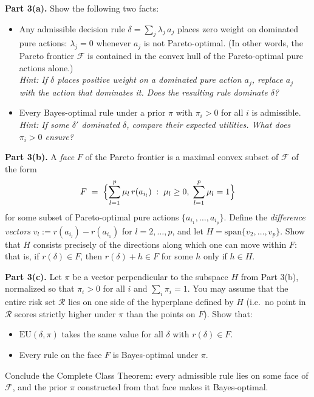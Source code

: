 \documentclass[8pt]{article}
\begin{document}
\medskip
\noindent
\textbf{Part 3(a).} Show the following two facts:
\begin{itemize}
  \item[(i)] Any admissible decision rule $\delta = \sum_j \lambda_j\, a_j$ places
    zero weight on dominated pure actions: $\lambda_j = 0$ whenever $a_j$ is not
    Pareto-optimal. (In other words, the Pareto frontier $\mathcal{F}$ is contained
    in the convex hull of the Pareto-optimal pure actions alone.)\\
    \emph{Hint: If $\delta$ places positive weight on a dominated pure action $a_j$,
    replace $a_j$ with the action that dominates it. Does the resulting rule dominate
    $\delta$?}
  \item[(ii)] Every Bayes-optimal rule under a prior $\pi$ with $\pi_i > 0$ for all
    $i$ is admissible.\\
    \emph{Hint: If some $\delta'$ dominated $\delta$, compare their expected
    utilities. What does $\pi_i > 0$ ensure?}
\end{itemize}

\medskip
\noindent
\textbf{Part 3(b).} A \emph{face} $F$ of the Pareto frontier is a maximal convex
subset of $\mathcal{F}$ of the form
\[
  F \;=\; \Bigl\{\sum_{l=1}^p \mu_l\, r(a_{i_l}) \;:\;
  \mu_l \geq 0,\; \sum_{l=1}^p \mu_l = 1\Bigr\}
\]
for some subset of Pareto-optimal pure actions $\{a_{i_1}, \ldots, a_{i_p}\}$. Define
the \emph{difference vectors} $v_l := r(a_{i_l}) - r(a_{i_1})$ for
$l = 2, \ldots, p$, and let $H = \mathrm{span}\{v_2, \ldots, v_p\}$. Show that $H$
consists precisely of the directions along which one can move within $F$: that is, if
$r(\delta) \in F$, then $r(\delta) + h \in F$ for some $h$ only if $h \in H$.

\medskip
\noindent
\textbf{Part 3(c).} Let $\pi$ be a vector perpendicular to the subspace $H$ from
Part 3(b), normalized so that $\pi_i > 0$ for all $i$ and $\sum_i \pi_i = 1$. You may
assume that the entire risk set $\mathcal{R}$ lies on one side of the hyperplane
defined by $H$ (i.e.\ no point in $\mathcal{R}$ scores strictly higher under $\pi$
than the points on $F$). Show that:
\begin{itemize}
  \item[(i)] $\mathrm{EU}(\delta, \pi)$ takes the same value for all $\delta$ with
    $r(\delta) \in F$.
  \item[(ii)] Every rule on the face $F$ is Bayes-optimal under $\pi$.
\end{itemize}
Conclude the Complete Class Theorem: every admissible rule lies on some face of
$\mathcal{F}$, and the prior $\pi$ constructed from that face makes it Bayes-optimal.
\end{document}
